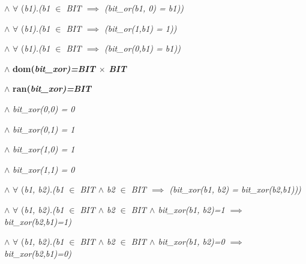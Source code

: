 \hspace*{0.20in} $\land$   $\forall$ \rm (\it b1\rm )\rm .\rm (\it b1  $\in$  \it BIT  $\implies$  \rm (\it bit\_or\rm (\it b1\rm , \rm 0\rm ) \rm = \it b1\rm )\rm )

\hspace*{0.20in} $\land$   $\forall$ \rm (\it b1\rm )\rm .\rm (\it b1  $\in$  \it BIT  $\implies$  \rm (\it bit\_or\rm (\rm 1\rm ,\it b1\rm ) \rm = \rm 1\rm )\rm )

\hspace*{0.20in} $\land$   $\forall$ \rm (\it b1\rm )\rm .\rm (\it b1  $\in$  \it BIT  $\implies$  \rm (\it bit\_or\rm (\rm 0\rm ,\it b1\rm ) \rm = \it b1\rm )\rm )

\vspace*{4mm}
\hspace*{0.20in} $\land$  \bf dom\rm (\it bit\_xor\rm )\rm =\it BIT $\times$ \it BIT

\hspace*{0.20in} $\land$  \bf ran\rm (\it bit\_xor\rm )\rm =\it BIT\hspace*{0.10in}

\hspace*{0.20in} $\land$  \it bit\_xor\rm (\rm 0\rm ,\rm 0\rm ) \rm = \rm 0

\hspace*{0.20in} $\land$  \it bit\_xor\rm (\rm 0\rm ,\rm 1\rm ) \rm = \rm 1

\hspace*{0.20in} $\land$  \it bit\_xor\rm (\rm 1\rm ,\rm 0\rm ) \rm = \rm 1

\hspace*{0.20in} $\land$  \it bit\_xor\rm (\rm 1\rm ,\rm 1\rm ) \rm = \rm 0

\hspace*{0.20in} $\land$   $\forall$ \rm (\it b1\rm , \it b2\rm )\rm .\rm (\it b1  $\in$  \it BIT  $\land$  \it b2  $\in$  \it BIT  $\implies$  \rm (\it bit\_xor\rm (\it b1\rm , \it b2\rm ) \rm = \it bit\_xor\rm (\it b2\rm ,\it b1\rm )\rm )\rm )

\hspace*{0.20in} $\land$   $\forall$ \rm (\it b1\rm , \it b2\rm )\rm .\rm (\it b1  $\in$  \it BIT  $\land$  \it b2 $\in$ \it BIT  $\land$  \it bit\_xor\rm (\it b1\rm , \it b2\rm )\rm =\rm 1  $\implies$  \it bit\_xor\rm (\it b2\rm ,\it b1\rm )\rm =\rm 1\rm )

\hspace*{0.20in} $\land$   $\forall$ \rm (\it b1\rm , \it b2\rm )\rm .\rm (\it b1  $\in$  \it BIT  $\land$  \it b2 $\in$ \it BIT  $\land$  \it bit\_xor\rm (\it b1\rm , \it b2\rm )\rm =\rm 0  $\implies$  \it bit\_xor\rm (\it b2\rm ,\it b1\rm )\rm =\rm 0\rm )

